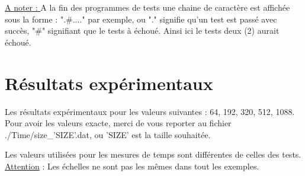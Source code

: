 \documentclass[10pt,a4paper]{article}
\begin{document}
\underline{A noter : } A la fin des programmes de tests une chaine de caractère est affichée sous la forme : ".\#...." par exemple, ou "." signifie qu'un test est passé avec succès, "\#" signifiant que le tests à échoué. Ainsi ici le tests deux (2) aurait échoué.

\section{Résultats expérimentaux}

Les résultats expérimentaux pour les valeurs suivantes : 64, 192, 320, 512, 1088. \\
Pour avoir les valeurs exacte, merci de vous reporter au fichier ./Time/size\_'SIZE'.dat, ou 'SIZE' est la taille souhaitée.

Les valeurs utilisées pour les mesures de temps sont différentes de celles des tests.\\
\underline{Attention} : Les échelles ne sont pas les mêmes dans tout les exemples.
\end{document}
